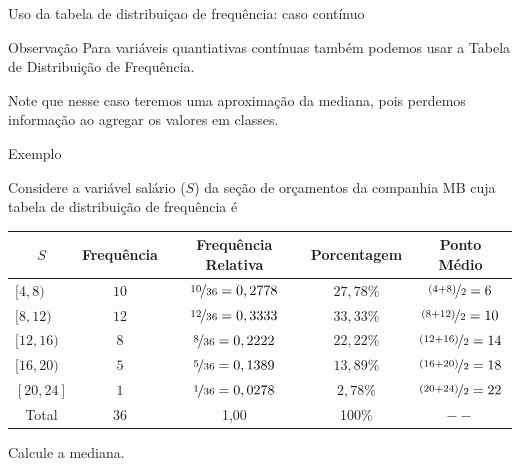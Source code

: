 \documentclass[8pt]{beamer}
\begin{document}
\begin{frame}{Uso da tabela de distribuiçao de frequência: caso contínuo}


\begin{block}{Observação}
  Para variáveis quantiativas contínuas também podemos usar a Tabela de Distribuição de Frequência. 
  
  Note que nesse caso teremos uma {\color{red} aproximação} da mediana, pois perdemos informação ao agregar os valores 
  em classes.
 \end{block}

 \begin{block}{Exemplo}
 
 Considere a variável salário ($S$) da seção de orçamentos da companhia MB cuja tabela de distribuição de frequência é 
   \begin{table}
   \centering
   \begin{tabular}{l|ccc|c}
    \toprule[0.05cm]
    \multicolumn{1}{c|}{$S$} & Frequência & Frequência Relativa & Porcentagem & Ponto Médio \\ \midrule[0.05cm]
    $[4, 8)$ & $10$ & $\nicefrac{10}{36}=0,2778$ & $27,78 \%$ & $\nicefrac{(4+8)}{2} = 6$ \\
    $[8, 12)$ & $12$ & $\nicefrac{12}{36}=0,3333$ & $33,33 \%$ & $\nicefrac{(8+12)}{2} = 10$\\
    $[12, 16)$ & $8$ & $\nicefrac{8}{36}=0,2222$ & $22,22 \%$ &  $\nicefrac{(12+16)}{2} = 14$\\
    $[16, 20)$ & $5$ & $\nicefrac{5}{36}=0,1389$ & $13,89 \%$ & $\nicefrac{(16+20)}{2} = 18$\\
    $[20, 24]$ & $1$ & $\nicefrac{1}{36}=0,0278$ & $2,78 \%$ & $\nicefrac{(20+24)}{2} =22$\\ \midrule[0.05cm]
    \multicolumn{1}{c|}{Total} & 36 & 1,00 & 100\% & $--$ \\ \bottomrule[0.05cm]
   \end{tabular}
  \end{table}
  Calcule a mediana. 
  \end{block}
\end{frame}
\end{document}
